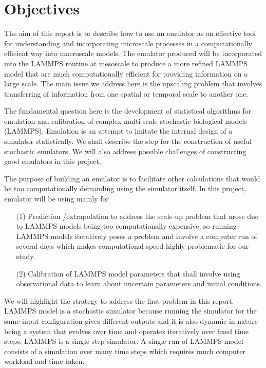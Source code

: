 \documentclass[12pt,titlepage]{report}
\theoremstyle{definition}
\theoremstyle{remark}
\begin{document}
\section{Objectives}
The aim of this report is to describe how to use an emulator as an effective tool for understanding and incorporating microscale processes in a computationally efficient way into macroscale models. The emulator produced will be incorporated into the LAMMPS routine at mesoscale to produce a more refined LAMMPS model that are much computationally efficient for providing information on a large scale. The main issue we address here is the upscaling problem that involves transferring of information from one spatial or temporal scale to another one.

The fundamental question here is the development of statistical algorithms for emulation and calibration of complex multi-scale stochastic biological models (LAMMPS).
Emulation is an attempt to imitate the internal design of a simulator statistically. We shall describe the step for the construction of useful stochastic emulators. We will also address possible challenges of constructing good emulators in this project. 

The purpose of building an emulator is to facilitate other calculations that would be too computationally demanding using the simulator itself. In this project, emulator will be using mainly for 
\begin{itemize}
\item[(1)] Prediction /extrapolation to address the scale-up problem that arose due to LAMMPS models being too computationally expensive, so running LAMMPS models iteratively poses a problem and involve a computer run of several days which makes computational speed highly problematic for our study.

\item[(2)] Calibration of LAMMPS model parameters that shall involve using observational data to learn about uncertain parameters and initial conditions. 
\end{itemize}

We will highlight the strategy to address the first problem in this report. LAMMPS model is a stochastic simulator because running the simulator for the same input configuration gives different outputs and it is also dynamic in nature being a system that evolves over time and operates iteratively over fixed time steps. LAMMPS is a single-step simulator. A single run of LAMMPS model consists of a simulation over many time steps which requires much computer workload and time taken.
\end{document}
